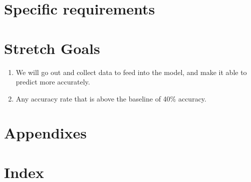 \documentclass[10pt, draftclsnofoot, onecolumn]{IEEEtran}
\begin{document}
\section{Specific requirements}
\section{Stretch Goals}
	\begin{enumerate}
		\item We will go out and collect data to feed into the model, and make it able to predict more accurately.
		\item Any accuracy rate that is above the baseline of 40\% accuracy.
	\end{enumerate}
\section*{Appendixes}
\section*{Index}
\end{document}
